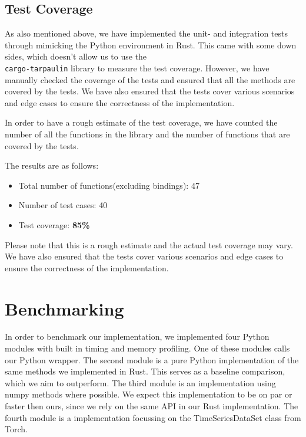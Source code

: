 \documentclass[review]{AIM_report}
\begin{document}
\subsection{Test Coverage}
As also mentioned above, we have implemented the unit- and integration tests through mimicking the Python environment in Rust.
This came with some down sides, which doesn't allow us to use the \\\texttt{cargo-tarpaulin} library to measure the test coverage.
However, we have manually checked the coverage of the tests and ensured that all the methods are covered by the tests. We have also ensured that the tests cover various scenarios and edge cases to ensure the correctness of the implementation.

In order to have a rough estimate of the test coverage, we have counted the number of all the functions in the library and the number of functions that are covered by the tests.

The results are as follows:
\begin{itemize}
    \item Total number of functions(excluding bindings): 47
    \item Number of test cases: 40
    \item Test coverage: \textbf{85\%}
\end{itemize}

Please note that this is a rough estimate and the actual test coverage may vary. We have also ensured that the tests cover various scenarios and edge cases to ensure the correctness of the implementation.

\newpage
\section{Benchmarking}
\label{sec:benchmarking}
In order to benchmark our implementation, we implemented four Python modules with built in timing and memory profiling. One of these modules calls our Python wrapper. The second module is a pure Python implementation of the same methods we implemented in Rust. This serves as a baseline comparison, which we aim to outperform. The third module is an implementation using numpy methods where possible. We expect this implementation to be on par or faster then ours, since we rely on the same API in our Rust implementation. The fourth module is a implementation focussing on the TimeSeriesDataSet class from Torch.
\end{document}
